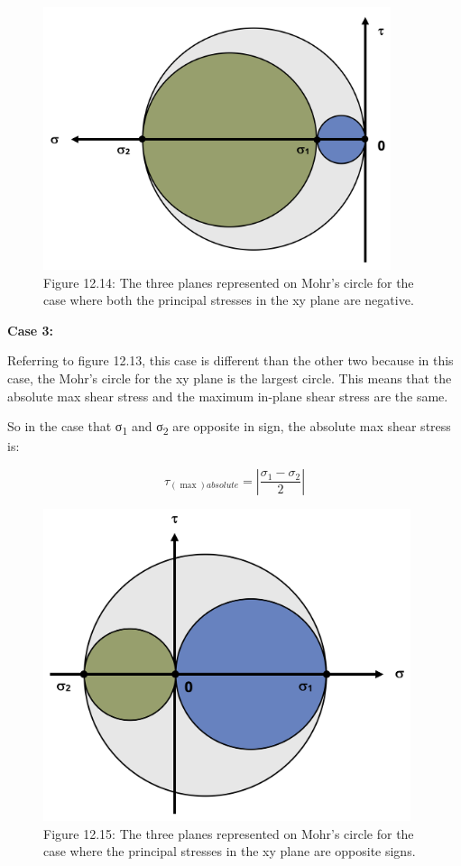 \documentclass[
  letterpaper,
  DIV=11,
  numbers=noendperiod]{scrreprt}
\theoremstyle{definition}
\theoremstyle{remark}
\begin{document}
\begin{figure}[H]

{\centering \includegraphics[width=4.01042in,height=\textheight]{images/CH12 figures/figure 12.14.png}

}

\caption{Figure 12.14: The three planes represented on Mohr's circle for
the case where both the principal stresses in the xy plane are
negative.}

\end{figure}%

\textbf{Case 3:}

Referring to figure 12.13, this case is different than the other two
because in this case, the Mohr's circle for the xy plane is the largest
circle. This means that the absolute max shear stress and the maximum
in-plane shear stress are the same.

So in the case that σ\textsubscript{1} and σ\textsubscript{2} are
opposite in sign, the absolute max shear stress is:

\[
\tau_{(\max )absolute}=\left|\frac{\sigma_1-\sigma_2}{2}\right|
\]

\begin{figure}[H]

{\centering \includegraphics[width=4.23958in,height=\textheight]{images/CH12 figures/figure 12.15.png}

}

\caption{Figure 12.15: The three planes represented on Mohr's circle for
the case where the principal stresses in the xy plane are opposite
signs.}

\end{figure}%
\end{document}
